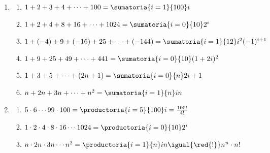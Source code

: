 \begin{enumerate}[label=\roman*)]
  \item
        \begin{enumerate}[label=\alph*)]
          \item  $
                  1 + 2 + 3 + 4 + \dots + 100 =
                  \sumatoria{i=1}{100}i
                $
          \item\label{ej1-2:item:i:b}
                $
                  1 + 2 + 4 + 8 + 16 + \dots + 1024 =
                  \sumatoria{i=0}{10}2^i
                $

          \item  $
                  1 + (-4) + 9 + (-16) + 25 + \dots + (-144) =
                  \sumatoria{i=1}{12}i^2(-1)^{i+1}
                $

          \item $
                  1 + 9 + 25 + 49 + \dots + 441 =
                  \sumatoria{i=0}{10}(1+2i)^2
                $

          \item $
                  1 + 3 + 5 + \dots + (2n + 1) =
                  \sumatoria{i=0}{n} 2i+1
                $

          \item $
                  n + 2n + 3n + \dots + n^2 =
                  \sumatoria{i=1}{n} in
                $
        \end{enumerate}

  \item \begin{enumerate}[label=\alph*)]
          \item $5 \cdot 6 \cdots 99 \cdot 100 =
                  \productoria{i=5}{100}i = \frac{100!}{4!}
                $

          \item $
                  1 \cdot 2 \cdot 4 \cdot 8 \cdot 16 \cdots 1024 =
                  \productoria{i=0}{10}2^i
                $

          \item $
                  n \cdot 2n \cdot 3n \cdots n^2 =
                  \productoria{i=1}{n}in \igual{\red{!}} n^n \cdot n!
                $
        \end{enumerate}
\end{enumerate}
